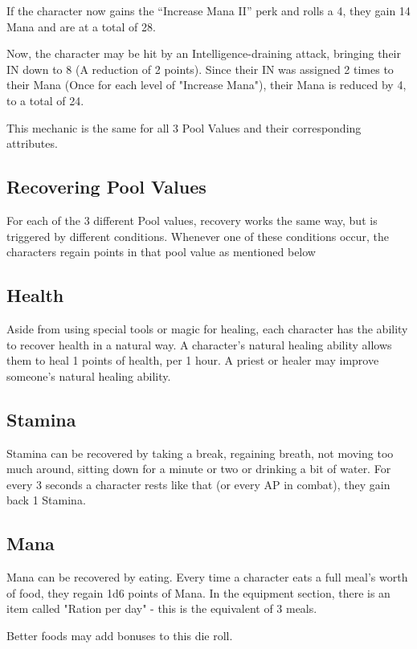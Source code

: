 If the character now gains the “Increase Mana II” perk and rolls a 4, they gain 14 Mana and are at a total of 28.

Now, the character may be hit by an Intelligence-draining attack, bringing their IN down to 8 (A reduction of 2 points). Since their IN was assigned 2 times to their Mana (Once for each level of "Increase Mana"), their Mana is reduced by 4, to a total of 24.


This mechanic is the same for all 3 Pool Values and their corresponding attributes.


\subsection{Recovering Pool Values}

For each of the 3 different Pool values, recovery works the same way, but is triggered by different conditions. Whenever one of these conditions occur, the characters regain points in that pool value as mentioned below


\subsection{Health}

Aside from using special tools or magic for healing, each character has the ability to recover health in a natural way. A character's natural healing ability allows them to heal 1 points of health, per 1 hour.
A priest or healer may improve someone's natural healing ability.


\subsection{Stamina}

Stamina can be recovered by taking a break, regaining breath, not moving too much around, sitting down for a minute or two or drinking a bit of water. For every 3 seconds a character rests like that (or every AP in combat), they gain back 1 Stamina.



\subsection{Mana}

Mana can be recovered by eating. Every time a character eats a full meal's worth of food, they regain 1d6 points of Mana. In the equipment section, there is an item called "Ration per day" - this is the equivalent of 3 meals.

Better foods may add bonuses to this die roll.
